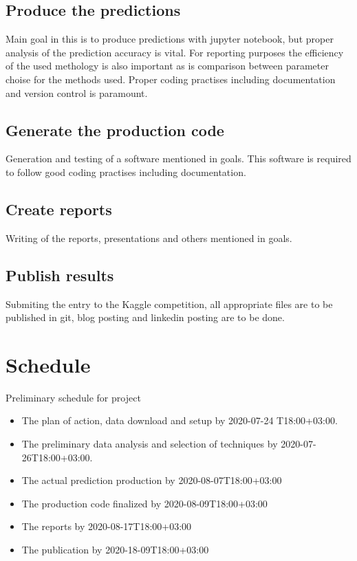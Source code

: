 \documentclass{article}
\begin{document}
\subsection{Produce the predictions}
Main goal in this is to produce predictions with jupyter notebook, but proper analysis of the prediction accuracy is vital. For reporting purposes the efficiency of the used methology is also important as is comparison between parameter choise for the methods used. Proper coding practises including documentation and version control is paramount.

\subsection{Generate the production code}
Generation and testing of a software mentioned in goals. This software is required to follow good coding practises including documentation.

\subsection{Create reports}
Writing of the reports, presentations and others mentioned in goals.
 
\subsection{Publish results}
Submiting the entry to the Kaggle competition, all appropriate files are to be published in git, blog posting and linkedin posting are to be done.

\section{Schedule}
Preliminary schedule for project
\begin{itemize}
	\item The plan of action, data download and setup by 2020-07-24 T18:00+03:00.
	\item The preliminary data analysis and selection of techniques by 2020-07-26T18:00+03:00.
	\item The actual prediction production by 2020-08-07T18:00+03:00
	\item The production code finalized by 2020-08-09T18:00+03:00
	\item The reports by 2020-08-17T18:00+03:00
	\item The publication by 2020-18-09T18:00+03:00
\end{itemize}
\end{document}

